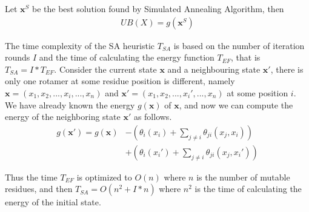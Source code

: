 Let $\mathbf{x}^{S}$ be the best solution found by Simulated Annealing Algorithm, then
\begin{align*}
  UB(X)=g(\mathbf{x}^{S})
\end{align*}

The time complexity of the SA heuristic $T_{SA}$ is based on the number of iteration rounds $I$ and the time of calculating the energy function $T_{EF}$, that is $T_{SA}=I*T_{EF}$. Consider the current state $\mathbf{x}$ and a neighbouring state $\mathbf{x}'$, there is only one rotamer at some residue position is different, namely $\mathbf{x}=(x_1,x_2,...,x_i,...,x_n)$ and $\mathbf{x}'=(x_1,x_2,...,x_i',...,x_n)$ at some position $i$. We have already known the energy $g(\mathbf{x})$ of $\mathbf{x}$, and now we can compute the energy of the neighboring state $\mathbf{x}'$ as follows.
\begin{align*}
g(\mathbf{x}')=g(\mathbf{x})&-\left(\theta_i(x_i)+\sum_{j\neq i}\theta_{ji}(x_j,x_i)\right)\\
&+\left(\theta_i(x_i')+\sum_{j\neq i}\theta_{ji}(x_j,x_i')\right)
\end{align*}

Thus the time $T_{EF}$ is optimized to $O(n)$ where $n$ is the number of mutable residues, and then $T_{SA}=O(n^2+I*n)$ where $n^2$ is the time of calculating the energy of the initial state.
